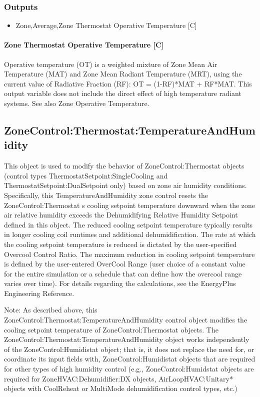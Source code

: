 \subsubsection{Outputs}\label{outputs-1-032}

\begin{itemize}
\tightlist
\item
  Zone,Average,Zone Thermostat Operative Temperature {[}C{]}
\end{itemize}

\paragraph{Zone Thermostat Operative Temperature {[}C{]}}\label{zone-thermostat-operative-temperature-c}

Operative temperature (OT) is a weighted mixture of Zone Mean Air Temperature (MAT) and Zone Mean Radiant Temperature (MRT), using the current value of Radiative Fraction (RF): OT = (1-RF)*MAT + RF*MAT. This output variable does not include the direct effect of high temperature radiant systems. See also Zone Operative Temperature.

\subsection{ZoneControl:Thermostat:TemperatureAndHumidity}\label{zonecontrolthermostattemperatureandhumidity}

This object is used to modify the behavior of ZoneControl:Thermostat objects (control types ThermostatSetpoint:SingleCooling and ThermostatSetpoint:DualSetpoint only) based on zone air humidity conditions. Specifically, this TemperatureAndHumidity zone control resets the ZoneControl:Thermostat s cooling setpoint temperature downward when the zone air relative humidity exceeds the Dehumidifying Relative Humidity Setpoint defined in this object. The reduced cooling setpoint temperature typically results in longer cooling coil runtimes and additional dehumidification. The rate at which the cooling setpoint temperature is reduced is dictated by the user-specified Overcool Control Ratio. The maximum reduction in cooling setpoint temperature is defined by the user-entered OverCool Range (user choice of a constant value for the entire simulation or a schedule that can define how the overcool range varies over time). For details regarding the calculations, see the EnergyPlus Engineering Reference.

Note: As described above, this ZoneControl:Thermostat:TemperatureAndHumidity control object modifies the cooling setpoint temperature of ZoneControl:Thermostat objects. The ZoneControl:Thermostat:TemperatureAndHumidity object works independently of the ZoneControl:Humidistat object; that is, it does not replace the need for, or coordinate its input fields with, ZoneControl:Humidistat objects that are required for other types of high humidity control (e.g., ZoneControl:Humidstat objects are required for ZoneHVAC:Dehumidifier:DX objects, AirLoopHVAC:Unitary* objects with CoolReheat or MultiMode dehumidification control types, etc.)

